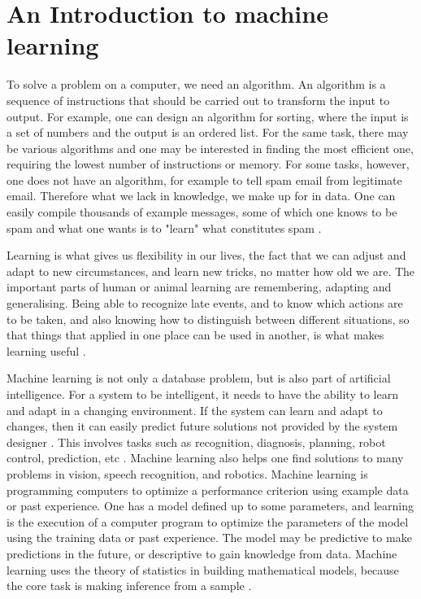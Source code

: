 \section{An Introduction to machine learning}
\label{Intro}

To solve a problem on a computer, we need an algorithm. An algorithm
is a sequence of instructions that should be carried out to transform
the input to output. For example, one can design an algorithm for
sorting, where the input is a set of numbers and the output is an ordered
list. For the same task, there may be various algorithms and one may be
interested in finding the most efficient one, requiring the lowest number of
instructions or memory. For some tasks, however, one does not have an algorithm, for example to tell spam email from legitimate email. Therefore what we lack in knowledge, we make up for in data. One can easily compile thousands of example messages, some of which one knows to be spam and what one wants is to "learn" what constitutes spam \citep{alpaydin2014introduction}. 

Learning is what gives us flexibility
in our lives, the fact that we can adjust and adapt to new circumstances, and learn new
tricks, no matter how old we are. The important parts of human or animal learning are remembering, adapting and generalising. Being able to recognize late events, and to know which actions are to be taken, and also knowing how to distinguish between different situations, so that things that applied in one place can be used in another, is what makes learning useful \citep{marsland2015machine}. 

 Machine learning is not only a database problem, but is also part
of artificial intelligence. For a system to be intelligent, it needs to have the ability to learn and adapt in a changing environment. If the system can learn and
adapt to changes, then it can easily predict future solutions not provided by the system designer \citep{alpaydin2014introduction}. This involves tasks such as recognition, diagnosis,
planning, robot control, prediction, etc \citep{nilsson1996introduction}.
Machine learning also helps one find solutions to many problems in vision,
speech recognition, and robotics. Machine learning is programming computers to optimize a performance criterion using example data or past experience. One has a model defined
up to some parameters, and learning is the execution of a computer program
to optimize the parameters of the model using the training data or
past experience. The model may be predictive to make predictions in the
future, or descriptive to gain knowledge from data.
Machine learning uses the theory of statistics in building mathematical
models, because the core task is making inference from a sample \citep{alpaydin2014introduction}.


